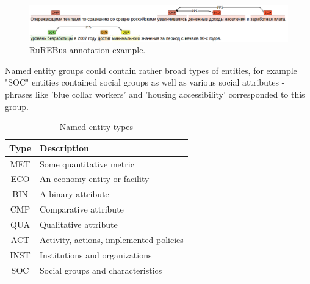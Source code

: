 \documentclass{dialogue}
\begin{document}
	\begin{figure}[thb]
		\centering
		\includegraphics[scale=0.4]{pics/brat}
		\caption{RuREBus annotation example.}
		\label{fig:brat}
	\end{figure}
	
	
	Named entity groups could contain rather broad types of entities, for example "SOC" entities contained social groups as well as various social attributes - phrases like 'blue collar workers' and 'housing accessibility' corresponded to this group.
	
	\begin{table}[bth]
		\centering
		\small
		\begin{tabular}{c||p{8cm}}
			\hline
			Type & Description\\ \hline
			MET & Some quantitative metric \\ \hline
			ECO & An economy entity or facility\\ \hline
			BIN & A binary attribute\\ \hline
			CMP & Comparative attribute\\ \hline
			QUA & Qualitative attribute\\ \hline
			ACT & Activity, actions, implemented policies\\ \hline
			INST & Institutions and organizations\\ \hline
			SOC & Social groups and characteristics\\ \hline
		\end{tabular}
		\caption{Named entity types}
		\label{tab:ner}
	\end{table}
\end{document}
